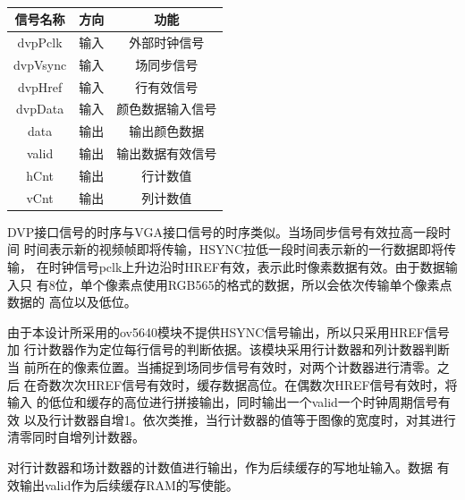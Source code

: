 \documentclass{article}
\numberwithin {equation}{section}
\begin{document}
\begin{spacing}{1.25}
      \begin{table}[H]
        \caption{}
        \label{dvp io table}
        \centering
        \begin{tabular}{ccc}
          \toprule
          信号名称 & 方向 & 功能\\
          \midrule
          dvpPclk & 输入 & 外部时钟信号\\
          dvpVsync & 输入 & 场同步信号\\
          dvpHref & 输入 & 行有效信号\\
          dvpData & 输入 & 颜色数据输入信号\\
          data & 输出 & 输出颜色数据\\
          valid & 输出 & 输出数据有效信号\\
          hCnt & 输出 & 行计数值\\
          vCnt & 输出 & 列计数值\\
          \bottomrule
        \end{tabular}
      \end{table}
      DVP接口信号的时序与VGA接口信号的时序类似。当场同步信号有效拉高一段时间
      时间表示新的视频帧即将传输，HSYNC拉低一段时间表示新的一行数据即将传输，
      在时钟信号pclk上升边沿时HREF有效，表示此时像素数据有效。由于数据输入只
      有8位，单个像素点使用RGB565的格式的数据，所以会依次传输单个像素点数据的
      高位以及低位。

      由于本设计所采用的ov5640模块不提供HSYNC信号输出，所以只采用HREF信号加
      行计数器作为定位每行信号的判断依据。该模块采用行计数器和列计数器判断当
      前所在的像素位置。当捕捉到场同步信号有效时，对两个计数器进行清零。之后
      在奇数次次HREF信号有效时，缓存数据高位。在偶数次HREF信号有效时，将输入
      的低位和缓存的高位进行拼接输出，同时输出一个valid一个时钟周期信号有效
      以及行计数器自增1。依次类推，当行计数器的值等于图像的宽度时，对其进行
      清零同时自增列计数器。
      
      对行计数器和场计数器的计数值进行输出，作为后续缓存的写地址输入。数据
      有效输出valid作为后续缓存RAM的写使能。


\end{spacing}
\end{document}
